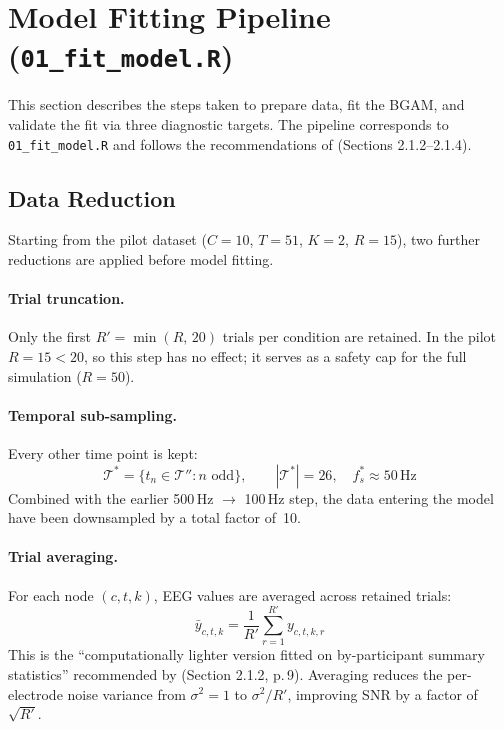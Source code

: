 \documentclass[12pt, a4paper]{article}
\begin{document}
\section{Model Fitting Pipeline (\texttt{01\_fit\_model.R})}\label{sec:fitting}

This section describes the steps taken to prepare data, fit the BGAM, and
validate the fit via three diagnostic targets.
The pipeline corresponds to \texttt{01\_fit\_model.R} and follows the
recommendations of \citet{Nalborczyk2025} (Sections 2.1.2--2.1.4).

\subsection{Data Reduction}\label{sec:reduction}

Starting from the pilot dataset
($C = 10$, $T = 51$, $K = 2$, $R = 15$),
two further reductions are applied before model fitting.

\paragraph{Trial truncation.}
Only the first $R' = \min(R,\,20)$ trials per condition are retained.
In the pilot $R = 15 < 20$, so this step has no effect; it serves as a
safety cap for the full simulation ($R = 50$).

\paragraph{Temporal sub-sampling.}
Every other time point is kept:
\begin{equation}\label{eq:subsample}
  \mathcal{T}^* = \bigl\{t_n \in \mathcal{T}'' : n \text{ odd}\bigr\},
  \qquad |\mathcal{T}^*| = 26, \quad f_s^* \approx 50\,\text{Hz}
\end{equation}
Combined with the earlier 500\,Hz $\to$ 100\,Hz step, the data entering
the model have been downsampled by a total factor of~10.

\paragraph{Trial averaging.}
For each node $(c, t, k)$, EEG values are averaged across retained trials:
\begin{equation}\label{eq:trial_avg}
  \bar{y}_{c,t,k} = \frac{1}{R'}\sum_{r=1}^{R'} y_{c,t,k,r}
\end{equation}
This is the ``computationally lighter version fitted on
by-participant summary statistics'' recommended by \citet{Nalborczyk2025}
(Section 2.1.2, p.\,9).
Averaging reduces the per-electrode noise variance from $\sigma^2 = 1$
to $\sigma^2 / R'$, improving SNR by a factor of $\sqrt{R'}$.
\end{document}

